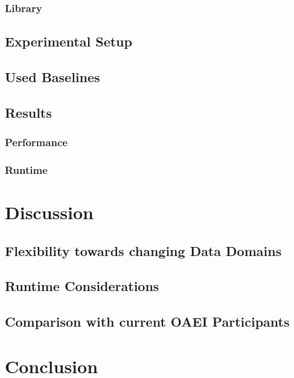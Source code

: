 \documentclass[11pt,titlepage,oneside,openany,a4paper]{report}
\begin{document}
\subsection{Library}
\section{Experimental Setup}
\section{Used Baselines}
\section{Results}
\subsection{Performance}
\subsection{Runtime}



\chapter{Discussion}
\section{Flexibility towards changing Data Domains}
\section{Runtime Considerations}
\section{Comparison with current OAEI Participants}


\chapter{Conclusion}


\clearpage
\newpage






\end{document}
